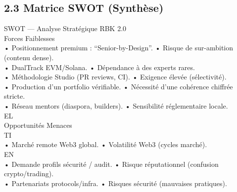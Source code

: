 \documentclass[12pt,landscape,a4paper]{article}
\begin{document}
\subsection{2.3 Matrice SWOT (Synthèse)}
SWOT — Analyse Stratégique RBK 2.0\\
\vspace{0.5em}
\vspace{0.5em}
Forces                                                           Faiblesses\\
• Positionnement premium : “Senior-by-Design”.                    • Risque de sur-ambition (contenu dense).\\
• DualTrack EVM/Solana.                                           • Dépendance à des experts rares.\\
• Méthodologie Studio (PR reviews, CI).                           • Exigence élevée (sélectivité).\\
• Production d’un portfolio vérifiable.                           • Nécessité d’une cohérence chiffrée stricte.\\
• Réseau mentors (diaspora, builders).                            • Sensibilité réglementaire locale.\\
\vspace{0.5em}
\vspace{0.5em}
\vspace{0.5em}
\vspace{0.5em}
EL\\
Opportunités                                                     Menaces\\
\vspace{0.5em}
\vspace{0.5em}
\vspace{0.5em}
\vspace{0.5em}
TI\\
• Marché remote Web3 global.                                      • Volatilité Web3 (cycles marché).\\
\vspace{0.5em}
\vspace{0.5em}
\vspace{0.5em}
\vspace{0.5em}
EN\\
• Demande profils sécurité / audit.                               • Risque réputationnel (confusion crypto/trading).\\
• Partenariats protocols/infra.                                   • Risques sécurité (mauvaises pratiques).\\
\vspace{0.5em}
\end{document}
